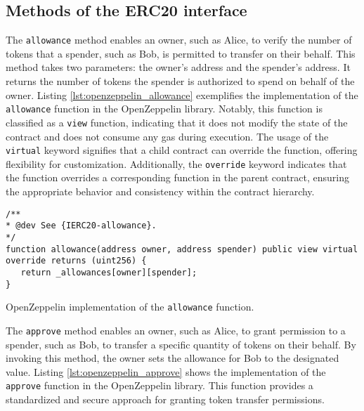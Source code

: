 
\subsection{Methods of the ERC20 interface}
\label{subsec:erc20_methods}


The \texttt{allowance} method enables an owner, such as Alice, to verify the number of tokens that a spender, such as Bob, is permitted to transfer on their behalf. This method takes two parameters: the owner's address and the spender's address. It returns the number of tokens the spender is authorized to spend on behalf of the owner.
Listing \ref{lst:openzeppelin_allowance} exemplifies the implementation of the \texttt{allowance} function in the OpenZeppelin library. Notably, this function is classified as a \texttt{view} function, indicating that it does not modify the state of the contract and does not consume any gas during execution.
The usage of the \texttt{virtual} keyword signifies that a child contract can override the function, offering flexibility for customization. Additionally, the \texttt{override} keyword indicates that the function overrides a corresponding function in the parent contract, ensuring the appropriate behavior and consistency within the contract hierarchy.


\begin{listing}[!ht]
   \begin{verbatim}
/**
* @dev See {IERC20-allowance}.
*/
function allowance(address owner, address spender) public view virtual override returns (uint256) {
   return _allowances[owner][spender];
}
   \end{verbatim}
   \caption{OpenZeppelin implementation of the \texttt{allowance} function.}
   \label{lst:openzeppelin_allowance}
\end{listing}



The \texttt{approve} method enables an owner, such as Alice, to grant permission to a spender, such as Bob, to transfer a specific quantity of tokens on their behalf. By invoking this method, the owner sets the allowance for Bob to the designated value.
Listing \ref{lst:openzeppelin_approve} shows the implementation of the \texttt{approve} function in the OpenZeppelin library. 
This function provides a standardized and secure approach for granting token transfer permissions.

